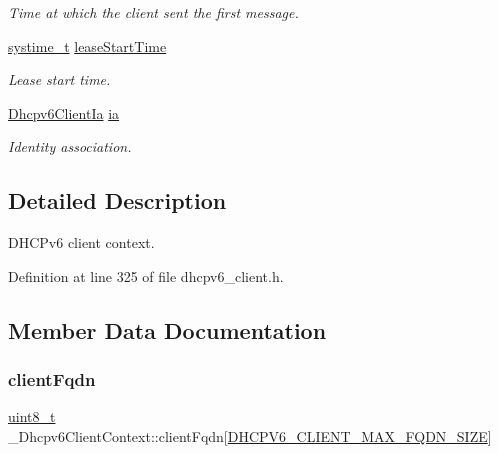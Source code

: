 \begin{DoxyCompactItemize}
\begin{DoxyCompactList}\small\item\em Time at which the client sent the first message. \end{DoxyCompactList}\item 
\hyperlink{compiler__port_8h_ae3e32a98d431a02106616da3071832dd}{systime\+\_\+t} \hyperlink{struct__Dhcpv6ClientContext_ab7c7ed18fe35758cfce3441b01f10117}{lease\+Start\+Time}
\begin{DoxyCompactList}\small\item\em Lease start time. \end{DoxyCompactList}\item 
\hyperlink{structDhcpv6ClientIa}{Dhcpv6\+Client\+Ia} \hyperlink{struct__Dhcpv6ClientContext_a976e8fd27765311dca2c9b0fd320b365}{ia}
\begin{DoxyCompactList}\small\item\em Identity association. \end{DoxyCompactList}\end{DoxyCompactItemize}


\subsection{Detailed Description}
D\+H\+C\+Pv6 client context. 

Definition at line 325 of file dhcpv6\+\_\+client.\+h.



\subsection{Member Data Documentation}
\mbox{\label{struct__Dhcpv6ClientContext_aadfc863a8dab30c8eafc78c909e84762}} 
\subsubsection{\texorpdfstring{client\+Fqdn}{clientFqdn}}
{\footnotesize\ttfamily \hyperlink{stdint_8h_aba7bc1797add20fe3efdf37ced1182c5}{uint8\+\_\+t} \+\_\+\+Dhcpv6\+Client\+Context\+::client\+Fqdn\mbox{[}\hyperlink{dhcpv6__client_8h_aec663ebfadf8f576b3b5b2b68b97678e}{D\+H\+C\+P\+V6\+\_\+\+C\+L\+I\+E\+N\+T\+\_\+\+M\+A\+X\+\_\+\+F\+Q\+D\+N\+\_\+\+S\+I\+ZE}\mbox{]}}



